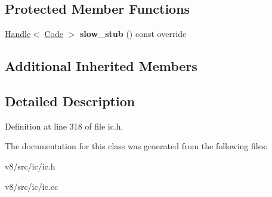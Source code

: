 \subsection*{Protected Member Functions}
\begin{DoxyCompactItemize}
\item 
\mbox{\label{classv8_1_1internal_1_1StoreGlobalIC_a8627524ce35be2991978f44e52a95ca5}} 
\mbox{\hyperlink{classv8_1_1internal_1_1Handle}{Handle}}$<$ \mbox{\hyperlink{classv8_1_1internal_1_1Code}{Code}} $>$ {\bfseries slow\+\_\+stub} () const override
\end{DoxyCompactItemize}
\subsection*{Additional Inherited Members}


\subsection{Detailed Description}


Definition at line 318 of file ic.\+h.



The documentation for this class was generated from the following files\+:\begin{DoxyCompactItemize}
\item 
v8/src/ic/ic.\+h\item 
v8/src/ic/ic.\+cc\end{DoxyCompactItemize}
